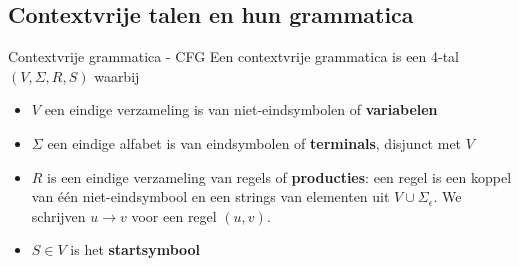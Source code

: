 

\subsection{Contextvrije talen en hun grammatica}

\vspace{0.5cm}

\begin{theo}{Contextvrije grammatica - CFG}
    Een contextvrije grammatica is een 4-tal $(V, \Sigma, R, S)$ waarbij
    \begin{itemize}
        \item $V$ een eindige verzameling is van niet-eindsymbolen of \textbf{variabelen}
        \item $\Sigma$ een eindige alfabet is van eindsymbolen of \textbf{terminals}, disjunct met $V$
        \item $R$ is een eindige verzameling van regels of \textbf{producties}: een regel is een koppel van één niet-eindsymbool en een strings van elementen uit $V \cup \Sigma_{\epsilon}$. 
              We schrijven $u \to v$ voor een regel $(u,v)$.
        \item $S \in V$ is het \textbf{startsymbool}
    \end{itemize}
    \vspace{-0.3cm}
\end{theo}

